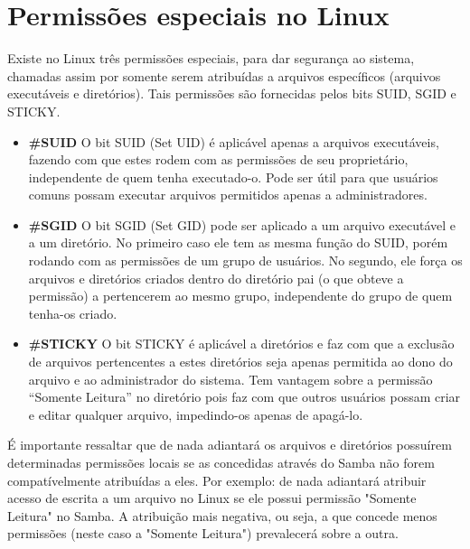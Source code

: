 
\section{Permissões especiais no Linux}

Existe no Linux três permissões especiais, para dar segurança ao sistema, chamadas assim por somente serem atribuídas a arquivos específicos (arquivos executáveis e diretórios). Tais permissões são fornecidas pelos bits SUID, SGID e STICKY.

  \begin{itemize}
    \item \textbf{\#SUID} O bit SUID (Set UID) é aplicável apenas a arquivos executáveis, fazendo com que estes rodem com as permissões de seu proprietário, independente de quem tenha executado-o. Pode ser útil para que usuários comuns possam executar arquivos permitidos apenas a administradores.

    \item \textbf{\#SGID} O bit SGID (Set GID) pode ser aplicado a um arquivo executável e a um diretório. No primeiro caso ele tem as mesma função do SUID, porém rodando com as permissões de um grupo de usuários. No segundo, ele força os arquivos e diretórios criados dentro do diretório pai (o que obteve a permissão) a pertencerem ao mesmo grupo, independente do grupo de quem tenha-os criado.

    \item \textbf{\#STICKY} O bit STICKY é aplicável a diretórios e faz com que a exclusão de arquivos pertencentes a estes diretórios seja apenas permitida ao dono do arquivo e ao administrador do sistema. Tem vantagem sobre a permissão “Somente Leitura” no diretório pois faz com que outros usuários possam criar e editar qualquer arquivo, impedindo-os apenas de apagá-lo.
  \end{itemize}

É importante ressaltar que de nada adiantará os arquivos e diretórios possuírem determinadas permissões locais se as concedidas através do Samba não forem compatívelmente atribuídas a eles. Por exemplo: de nada adiantará atribuir acesso de escrita a um arquivo no Linux se ele possui permissão "Somente Leitura" no Samba. A atribuição mais negativa, ou seja, a que concede menos permissões (neste caso a "Somente Leitura") prevalecerá sobre a outra.

